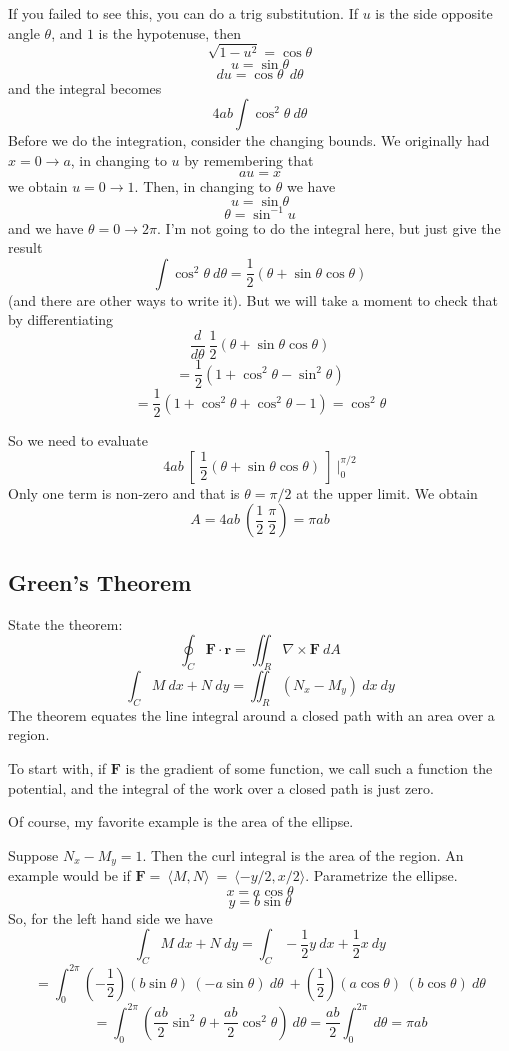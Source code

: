 \documentclass[11pt, oneside]{report}   	%
\begin{document}
If you failed to see this, you can do a trig substitution.  If $u$ is the side opposite angle $\theta$, and $1$ is the hypotenuse, then 
\[ \sqrt{1-u^2} = \cos \theta \]
\[ u = \sin \theta \]
\[ du = \cos \theta \ \ d\theta \]
and the integral becomes
\[ 4 ab \int \cos^2 \theta \ d\theta  \]
Before we do the integration, consider the changing bounds.  We originally had $x = 0 \rightarrow a$, in changing to $u$ by remembering that
\[ au = x \]
we obtain $u = 0 \rightarrow 1$.  Then, in changing to $\theta$ we have
\[ u = \sin \theta \]
\[ \theta = \sin^{-1} u \]
and we have $\theta = 0 \rightarrow 2\pi$.
I'm not going to do the integral here, but just give the result
\[ \int \cos^2 \theta \ d \theta = \frac{1}{2} (\theta + \sin \theta \cos \theta) \]
(and there are other ways to write it).  But we will take a moment to check that by differentiating
\[ \frac{d}{d \theta} \ \frac{1}{2} (\theta + \sin \theta \cos \theta) \]
\[ =  \frac{1}{2}(1 + \cos^2 \theta - \sin^2 \theta) \]
\[ =  \frac{1}{2}(1 + \cos^2 \theta + \cos^2 \theta - 1) = \cos^2 \theta \]

So we need to evaluate
\[ 4ab \ [ \ \frac{1}{2} (\theta + \sin \theta \cos \theta) \ ] \ \bigg |_0^{\pi/2} \]
Only one term is non-zero and that is $\theta = \pi/2$ at the upper limit.  We obtain
\[ A = 4ab \ (\frac{1}{2}\ \frac{\pi}{2}) = \pi ab \]

\subsection*{Green's Theorem}
State the theorem:
\[ \oint_C \mathbf{F} \cdot \mathbf{r} = \iint_R \nabla \times \mathbf{F} \ dA \]
\[ \int_C M \ dx + N \ dy = \iint_R (N_x - M_y) \ dx \ dy \]
The theorem equates the line integral around a closed path with an area over a region.

To start with, if $\mathbf{F}$ is the gradient of some function, we call such a function the potential, and the integral of the work over a closed path is just zero.

Of course, my favorite example is the area of the ellipse.  

Suppose $N_x - M_y = 1$.  Then the curl integral is the area of the region.  An example would be if $\mathbf{F} = \ \langle M,N \rangle \ = \ \langle -y/2,x/2 \rangle$.  Parametrize the ellipse.
\[ x = a \cos \theta \]
\[ y = b \sin \theta \]
So, for the left hand side we have
\[ \int_C M \ dx + N \ dy = \int_C -\frac{1}{2}y \ dx + \frac{1}{2}x \ dy \]
\[ = \int_0^{2\pi} (-\frac{1}{2})(b \sin \theta) \ (-a \sin \theta) \ d \theta \ + (\frac{1}{2})(a \cos \theta) \ (b \cos \theta) \ d\theta \]
\[ = \int_0^{2\pi} (\frac{ab}{2}\sin^2 \theta + \frac{ab}{2}\cos^2 \theta) \ d \theta = \frac{ab}{2} \int_0^{2\pi} \ d \theta = \pi a b\]
\end{document}

